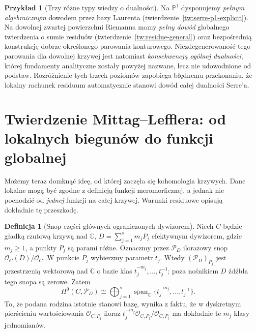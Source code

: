 \documentclass[11pt,a4paper,openany]{report}
\numberwithin{equation}{section}
\theoremstyle{plain}
\theoremstyle{definition}
\newtheorem{definicja}[twierdzenie]{Definicja}
\newtheorem{przyklad}[twierdzenie]{Przykład}
\theoremstyle{remark}
\newcommand{\C}{\mathbb C}
\newcommand{\PP}{\mathbb P}
\begin{document}
\begin{przyklad}[Trzy różne typy wiedzy o dualności]
Na $\PP^1$ dysponujemy \emph{pełnym algebraicznym}
dowodem przez bazy Laurenta
(twierdzenie~\ref{tw:serre-p1-explicit}).
Na dowolnej zwartej powierzchni Riemanna
mamy \emph{pełny dowód} globalnego twierdzenia
o sumie residuów (twierdzenie~\ref{tw:residue-general})
oraz bezpośrednią konstrukcję dobrze określonego
parowania konturowego. Niezdegenerowaność
tego parowania dla dowolnej krzywej jest
natomiast \emph{konsekwencją ogólnej dualności},
której fundamenty analityczne zostały powyżej
nazwane, lecz nie udowodnione od podstaw.
Rozróżnienie tych trzech poziomów zapobiega
błędnemu przekonaniu, że lokalny rachunek
residuum automatycznie stanowi dowód całej
dualności Serre'a.
\end{przyklad}


\section{Twierdzenie Mittag--Lefflera: od lokalnych biegunów do funkcji globalnej}
\label{sec:mittag-residue}

Możemy teraz domknąć ideę, od której zaczęła się
kohomologia krzywych. Dane lokalne mogą być zgodne
z definicją funkcji meromorficznej, a jednak nie
pochodzić od \emph{jednej} funkcji na całej krzywej.
Warunki residuowe opisują dokładnie tę przeszkodę.

\begin{definicja}[Snop części głównych ograniczonych dywizorem]
Niech $C$ będzie gładką rzutową krzywą nad $\C$,
$D=\sum_{j=1}^sm_jP_j$ efektywnym dywizorem,
gdzie $m_j\ge1$, a punkty $P_j$ są parami różne.
Oznaczmy przez $\mathcal P_D$ ilorazowy snop
$\mathcal O_C(D)/\mathcal O_C$.
W punkcie $P_j$ wybierzmy parametr $t_j$.
Wtedy $(\mathcal P_D)_{P_j}$ jest przestrzenią
wektorową nad $\C$ o bazie klas
$t_j^{-m_j},\ldots,t_j^{-1}$; poza nośnikiem $D$
źdźbła tego snopa są zerowe. Zatem
\[
 H^0(C,\mathcal P_D)\cong
 \bigoplus_{j=1}^s
 \operatorname{span}_{\C}
 \{t_j^{-m_j},\ldots,t_j^{-1}\}.
\]
To, że podana rodzina istotnie stanowi bazę,
wynika z faktu, że w dyskretnym pierścieniu
wartościowania $\mathcal O_{C,P_j}$ iloraz
$t_j^{-m_j}\mathcal O_{C,P_j}/\mathcal O_{C,P_j}$
ma dokładnie te $m_j$ klasy jednomianów.
\end{definicja}
\end{document}
